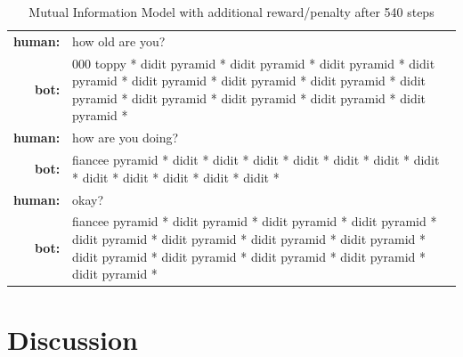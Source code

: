 \documentclass[letterpaper]{article}
\begin{document}
\begin{table}[bt!]
    \centering
    \small
    \caption{\small Mutual Information Model with additional reward/penalty after 540 steps}
    \begin{tabularx}{0.48\textwidth}{rX}
        \hline \hline
        \textbf{human:} & how old are you?    \\
        \textbf{bot:} & 000 toppy * didit pyramid * didit pyramid * didit pyramid * didit pyramid * didit pyramid * didit pyramid * didit pyramid * didit pyramid * didit pyramid * didit pyramid * didit pyramid * didit pyramid *\\
        \textbf{human:} & how are you doing? \\
        \textbf{bot:} & fiancee pyramid * didit * didit * didit * didit * didit * didit * didit * didit * didit * didit * didit * didit *\\
        \textbf{human:} & okay? \\
        \textbf{bot:} & fiancee pyramid * didit pyramid * didit pyramid * didit pyramid * didit pyramid * didit pyramid * didit pyramid * didit pyramid * didit pyramid * didit pyramid * didit pyramid * didit pyramid * didit pyramid * \\
        \hline \hline    
    \end{tabularx}
    \label{table:mi_03}
\end{table}

\section{Discussion}

%
%


\end{document}
